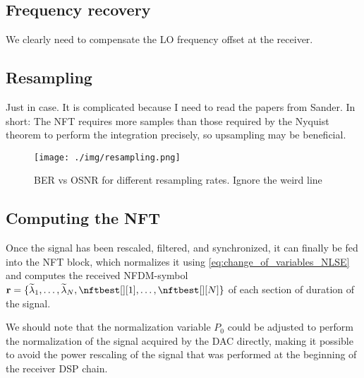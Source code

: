 \begin{extendedthesis}

\subsection{Frequency recovery}
We clearly need to compensate the \ac{LO} frequency offset at the receiver.

\subsection{Resampling}
Just in case. It is complicated because I need to read the papers from Sander.
In short: The \ac{NFT} requires more samples than those required by the Nyquist theorem
to perform the integration precisely, so upsampling may be beneficial.

\begin{figure}[!t]
  \centering
  \texttt{[image: ./img/resampling.png]}
  \caption{BER vs \ac{OSNR} for different resampling rates. Ignore the weird line}
  \label{fig:timing_error}
\end{figure}

\end{extendedthesis}


\subsection{Computing the \ac{NFT}}\label{sec:nfdm_nft}
Once the signal has been rescaled, filtered, and synchronized, it can  finally be fed into the \ac{NFT} block, which normalizes it using \eqref{eq:change_of_variables_NLSE} and computes the received \ac{NFDM}-symbol  $\matr{r} = \nfdmsymrx$ of each section of duration \Ts{} of the signal.

\begin{extendedthesis}
We should note that the normalization variable $P_0$ could be adjusted to perform the normalization of the signal acquired by the \ac{DAC} directly, making it possible to avoid the power rescaling of the
signal that was performed at the beginning of the receiver \ac{DSP} chain.
\end{extendedthesis}

